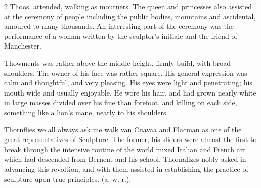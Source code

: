 \documentclass[10pt]{article}
\begin{document}
\begin{multicols}{2}\raggedcolumns
Thoos. attended, walking as mourners. The queen and princesses also assisted at the ceremony of people including the public bodies, mountains and ascidental, amoured to many thousands. An interesting part of the ceremony was the performance of a woman written by the sculptor’s initiale and the friend of Manchester.

Thowments was rather above the middle height, firmly build, with broad shoulders. The owner of his face was rather square. His general expression was calm and thoughtful, and very pleasing. His eyes were light and penetrating; his mouth wide and usually enjoyable. He wore his hair, and had grown nearly white in large masses divided over his fine than forefoot, and killing on each side, something like a lion’s mane, nearly to his shoulders.

Thornflies we all always ask me walk van Cuavaa and Flacman as one of the great representatives of Sculpture. The former, his sliders were almost the first to break through the intensive routine of the world mixed Italian and French art which had descended from Bernent and his school. Thornalizes nobly asked in advancing this revoltion, and with them assisted in establishing the practice of sculpture upon true principles. (a. w.-r.).


\end{multicols}
\end{document}
